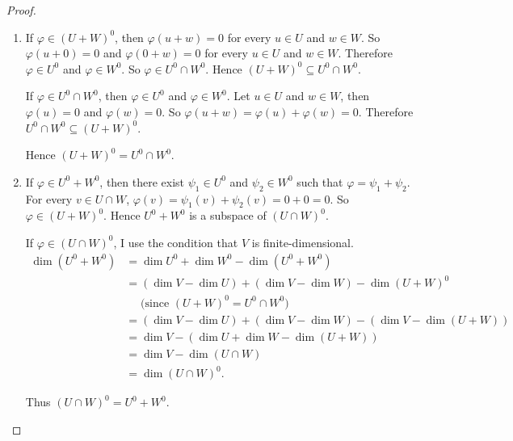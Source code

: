 \begin{proof}
    \begin{enumerate}[label={(\alph*)}]
        \item If $\varphi\in {(U + W)}^{0}$, then $\varphi(u + w) = 0$ for every $u\in U$ and $w\in W$. So $\varphi(u + 0) = 0$ and $\varphi(0 + w) = 0$  for every $u\in U$ and $w\in W$. Therefore $\varphi\in U^{0}$ and $\varphi\in W^{0}$. So $\varphi\in U^{0}\cap W^{0}$. Hence ${(U + W)}^{0}\subseteq U^{0}\cap W^{0}$.

              If $\varphi\in U^{0}\cap W^{0}$, then $\varphi\in U^{0}$ and $\varphi\in W^{0}$. Let $u\in U$ and $w\in W$, then $\varphi(u) = 0$ and $\varphi(w) = 0$. So $\varphi(u + w) = \varphi(u) + \varphi(w) = 0$. Therefore $U^{0}\cap W^{0}\subseteq {(U + W)}^{0}$.

              Hence ${(U + W)}^{0} = U^{0}\cap W^{0}$.
        \item If $\varphi\in U^{0} + W^{0}$, then there exist $\psi_{1}\in U^{0}$ and $\psi_{2}\in W^{0}$ such that $\varphi = \psi_{1} + \psi_{2}$. For every $v\in U\cap W$, $\varphi(v) = \psi_{1}(v) + \psi_{2}(v) = 0 + 0 = 0$. So $\varphi\in {(U + W)}^{0}$. Hence $U^{0} + W^{0}$ is a subspace of ${(U\cap W)}^{0}$.

              If $\varphi\in {(U\cap W)}^{0}$, I use the condition that $V$ is finite-dimensional.
              \begin{align*}
                  \dim (U^{0} + W^{0}) & = \dim U^{0} + \dim W^{0} - \dim (U^{0} + W^{0})                  \\
                                       & = (\dim V - \dim U) + (\dim V - \dim W) - \dim {(U + W)}^{0}      \\
                                       & \phantom{=} \text{(since ${(U  +W)}^{0} = U^{0}\cap W^{0}$)}      \\
                                       & = (\dim V - \dim U) + (\dim V - \dim W) - (\dim V - \dim (U + W)) \\
                                       & = \dim V - (\dim U + \dim W - \dim (U + W))                       \\
                                       & = \dim V - \dim (U \cap W)                                        \\
                                       & = \dim {(U\cap W)}^{0}.
              \end{align*}

              Thus ${(U\cap W)}^{0} = U^{0} + W^{0}$.\qedhere
    \end{enumerate}
\end{proof}
\newpage

